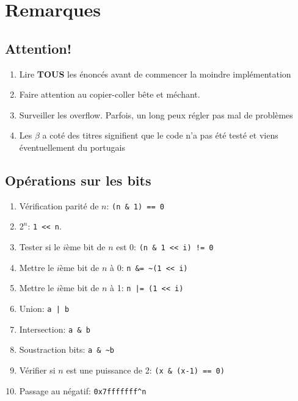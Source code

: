 \section{Remarques}
\subsection{Attention!}
\begin{enumerate}
	\item Lire \textbf{TOUS} les énoncés avant de commencer la moindre implémentation
	\item Faire attention au copier-coller bête et méchant.
	\item Surveiller les overflow. Parfois, un long peux régler pas mal de problèmes
	\item Les $\beta$ a coté des titres signifient que le code n'a pas été testé et viens éventuellement du portugais
\end{enumerate}
 
\subsection{Opérations sur les bits}
\begin{enumerate}
	\item Vérification parité de $n$: \lstinline{(n & 1) == 0}
	\item $2^n$: \lstinline|1 << n|.
	\item Tester si le $i$ème bit de $n$ est $0$: \lstinline{(n & 1 << i) != 0}
	\item Mettre le $i$ème bit de $n$ à 0: \lstinline{n &= ~(1 << i)}
	\item Mettre le $i$ème bit de $n$ à 1: \lstinline{n |= (1 << i)}
	\item Union: \lstinline{a | b}
	\item Intersection: \lstinline{a & b}
	\item Soustraction bits: \lstinline{a & ~b}
	\item Vérifier si $n$ est une puissance de 2: \lstinline{(x & (x-1) == 0)}
	\item Passage au négatif: \lstinline{0x7fffffff^n}
\end{enumerate}